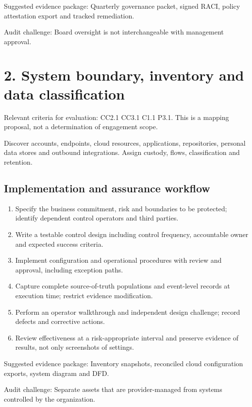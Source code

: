 \documentclass[10pt,oneside]{report}
\begin{document}
Suggested evidence package: Quarterly governance packet, signed RACI, policy attestation export and tracked remediation.

Audit challenge: Board oversight is not interchangeable with management approval.

\section{2. System boundary, inventory and data classification}
Relevant criteria for evaluation: CC2.1 CC3.1 C1.1 P3.1. This is a mapping proposal, not a determination of engagement scope.

\begin{engineeringbox}
Discover accounts, endpoints, cloud resources, applications, repositories, personal data stores and outbound integrations. Assign custody, flows, classification and retention.
\end{engineeringbox}
\subsection{Implementation and assurance workflow}
\begin{enumerate}
\item Specify the business commitment, risk and boundaries to be protected; identify dependent control operators and third parties.
\item Write a testable control design including control frequency, accountable owner and expected success criteria.
\item Implement configuration and operational procedures with review and approval, including exception paths.
\item Capture complete source-of-truth populations and event-level records at execution time; restrict evidence modification.
\item Perform an operator walkthrough and independent design challenge; record defects and corrective actions.
\item Review effectiveness at a risk-appropriate interval and preserve evidence of results, not only screenshots of settings.
\end{enumerate}

Suggested evidence package: Inventory snapshots, reconciled cloud configuration exports, system diagram and DFD.

Audit challenge: Separate assets that are provider-managed from systems controlled by the organization.
\end{document}

